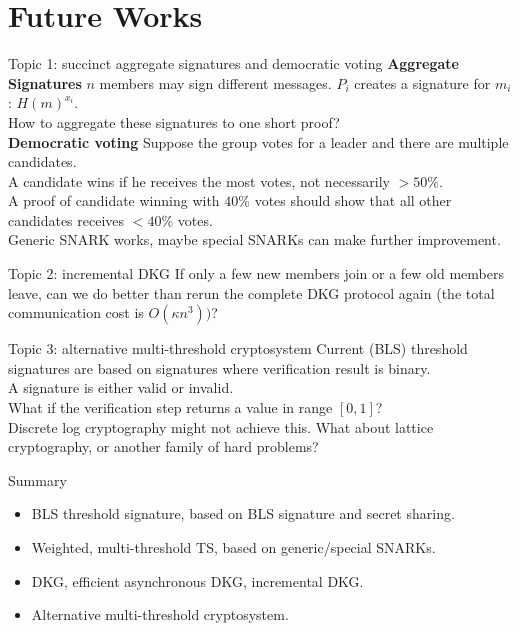 \section{Future Works}


\begin{frame}{Topic 1: succinct aggregate signatures and democratic voting}
\textbf{Aggregate Signatures}  $n$ members may sign different messages. $P_i$ creates a signature for $m_i$: $H(m)^{x_i}$. \\
How to aggregate these signatures to one short proof? \\
\vspace{0.5em}
\pause 
\textbf{Democratic voting} Suppose the group votes for a leader and there are multiple candidates. \\
A candidate wins if he receives the most votes, not necessarily $>50\%$. \\
A proof of candidate winning with $40\%$ votes should show that all other candidates receives $<40\%$ votes. \\
\pause 
\vspace{0.5em}
Generic SNARK works, maybe special SNARKs can make further improvement. 
\end{frame}

\begin{frame}{Topic 2: incremental DKG}
    If only a few new members join or a few old members leave, can we do better than rerun the complete DKG protocol again (the total communication cost is $O(\kappa n^3))$? \\
\end{frame}

\begin{frame}{Topic 3: alternative multi-threshold cryptosystem}
    Current (BLS) threshold signatures are based on signatures where verification result is binary. \\
    A signature is either valid or invalid. \\
    \vspace{0.5em} 
    What if the verification step returns a value in range $[0,1]$? \\
    Discrete log cryptography might not achieve this. What about lattice cryptography, or another family of hard problems?  
\end{frame}



\begin{frame}{Summary}
    \begin{itemize}
        \item BLS threshold signature, based on BLS signature and secret sharing.
        \item Weighted, multi-threshold TS, based on generic/special SNARKs.
        \item DKG, efficient asynchronous DKG, incremental DKG. 
        \item Alternative multi-threshold cryptosystem. 
    \end{itemize}
\end{frame}